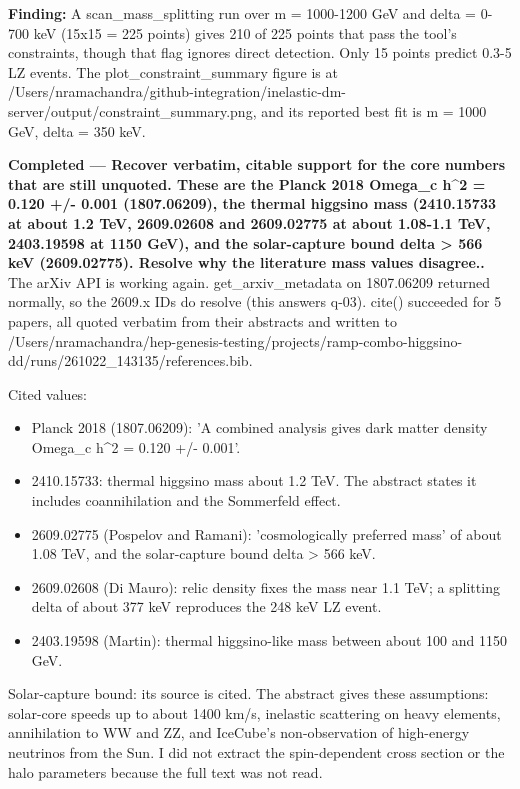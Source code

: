 \documentclass[11pt,a4paper]{article}
\begin{document}
\textbf{Finding:} A scan\_mass\_splitting run over m = 1000-1200 GeV and delta = 0-700 keV (15x15 = 225 points) gives 210 of 225 points that pass the tool's constraints, though that flag ignores direct detection. Only 15 points predict 0.3-5 LZ events. The plot\_constraint\_summary figure is at /Users/nramachandra/github-integration/inelastic-dm-server/output/constraint\_summary.png, and its reported best fit is m = 1000 GeV, delta = 350 keV.

\textbf{Completed --- Recover verbatim, citable support for the core numbers that are still unquoted. These are the Planck 2018 Omega\_c h\textasciicircum{}2 = 0.120 +/- 0.001 (1807.06209), the thermal higgsino mass (2410.15733 at about 1.2 TeV, 2609.02608 and 2609.02775 at about 1.08-1.1 TeV, 2403.19598 at 1150 GeV), and the solar-capture bound delta \textgreater{} 566 keV (2609.02775). Resolve why the literature mass values disagree..} The arXiv API is working again. get\_arxiv\_metadata on 1807.06209 returned normally, so the 2609.x IDs do resolve (this answers q-03). cite() succeeded for 5 papers, all quoted verbatim from their abstracts and written to /Users/nramachandra/hep-genesis-testing/projects/ramp-combo-higgsino-dd/runs/261022\_143135/references.bib.

Cited values:

\begin{itemize}
  \item Planck 2018 (1807.06209): 'A combined analysis gives dark matter density Omega\_c h\textasciicircum{}2 = 0.120 +/- 0.001'.
  \item 2410.15733: thermal higgsino mass about 1.2 TeV. The abstract states it includes coannihilation and the Sommerfeld effect.
  \item 2609.02775 (Pospelov and Ramani): 'cosmologically preferred mass' of about 1.08 TeV, and the solar-capture bound delta \textgreater{} 566 keV.
  \item 2609.02608 (Di Mauro): relic density fixes the mass near 1.1 TeV; a splitting delta of about 377 keV reproduces the 248 keV LZ event.
  \item 2403.19598 (Martin): thermal higgsino-like mass between about 100 and 1150 GeV.
\end{itemize}
Solar-capture bound: its source is cited. The abstract gives these assumptions: solar-core speeds up to about 1400 km/s, inelastic scattering on heavy elements, annihilation to WW and ZZ, and IceCube's non-observation of high-energy neutrinos from the Sun. I did not extract the spin-dependent cross section or the halo parameters because the full text was not read.
\end{document}
